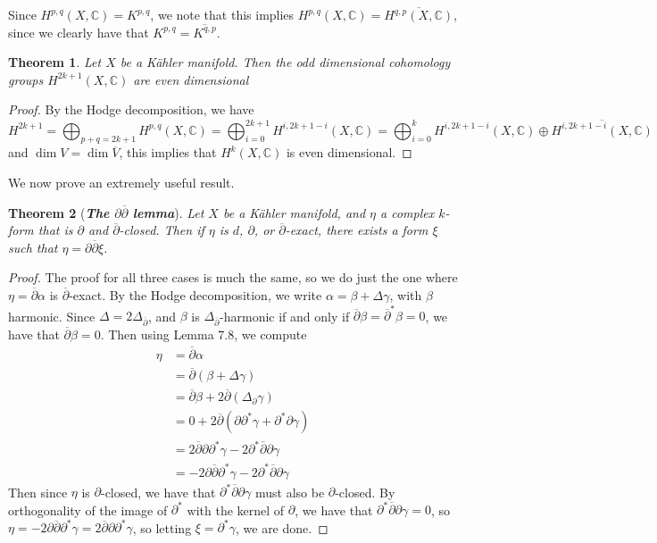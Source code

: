 \documentclass[psamsfonts, 12pt]{amsart}
\newtheorem{thm}{Theorem}[section]
\theoremstyle{definition}
\theoremstyle{remark}
\newcommand{\ib}[1]{\textbf{\textit{#1}}}
\newcommand{\C}{\mathbb{C}}
\newcommand{\dbar}{\overline{\partial}}
\begin{document}
%
Since $H^{p,q}(X,\C) = K^{p,q}$, we note that this implies
$H^{p,q}(X,\C) = \overline{H^{q,p}(X,\C)}$, since we clearly
have that $K^{p,q} = \overline{K^{q,p}}$.
%
\begin{thm}
Let $X$ be a K\"ahler manifold. Then the odd dimensional cohomology groups
$H^{2k+1}(X,\C)$ are even dimensional
\end{thm}
%
\begin{proof}
By the Hodge decomposition, we have
\[
H^{2k+1} = \bigoplus_{p+q=2k+1}H^{p,q}(X,\C)
= \bigoplus_{i=0}^{2k+1}H^{i, 2k+1-i}(X,\C)
= \bigoplus_{i=0}^kH^{i,2k+1-i}(X,\C) \oplus \overline{H^{i,2k+1-i}(X,\C)}
\]
and $\dim V = \dim\overline{V}$, this implies that $H^k(X,\C)$ is even dimensional.
\end{proof}
%
We now prove an extremely useful result.
%
\begin{thm}[\ib{The $\partial\dbar$ lemma}]
Let $X$ be a K\"ahler manifold, and $\eta$ a complex $k$-form that is $\partial$
and $\dbar$-closed. Then if $\eta$ is $d$, $\partial$, or $\dbar$-exact, there exists
a form $\xi$ such that $\eta = \partial\dbar\xi$.
\end{thm}
%
\begin{proof}
The proof for all three cases is much the same, so we do just the one where
$\eta = \dbar\alpha$ is $\dbar$-exact. By the Hodge decomposition, we write
$\alpha = \beta + \Delta\gamma$, with $\beta$ harmonic. Since
$\Delta = 2\Delta_{\dbar}$, and $\beta$ is $\Delta_{\dbar}$-harmonic if and only
if $\dbar\beta = \dbar^*\beta = 0$, we have that $\dbar\beta = 0$. Then
using Lemma 7.8, we compute
\begin{align*}
\eta &= \dbar\alpha \\
&= \dbar(\beta + \Delta\gamma) \\
&= \dbar\beta + 2\dbar(\Delta_\partial\gamma) \\
&= 0 + 2\dbar(\partial\partial^*\gamma + \partial^*\partial\gamma) \\
&= 2\dbar\partial\partial^*\gamma - 2\partial^*\dbar\partial\gamma \\
&= -2\partial\dbar\partial^*\gamma - 2\partial^*\dbar\partial\gamma
\end{align*}
Then since $\eta$ is $\partial$-closed, we have that $\partial^*\dbar\partial\gamma$
must also be $\partial$-closed. By orthogonality of the image of $\partial^*$ with
the kernel of $\partial$, we have that $\partial^*\dbar\partial\gamma = 0$,
so $\eta = -2\partial\dbar\partial^*\gamma = 2\dbar\partial\partial^*\gamma$,
so letting $\xi = \partial^*\gamma$, we are done.
\end{proof}
%
\end{document}
